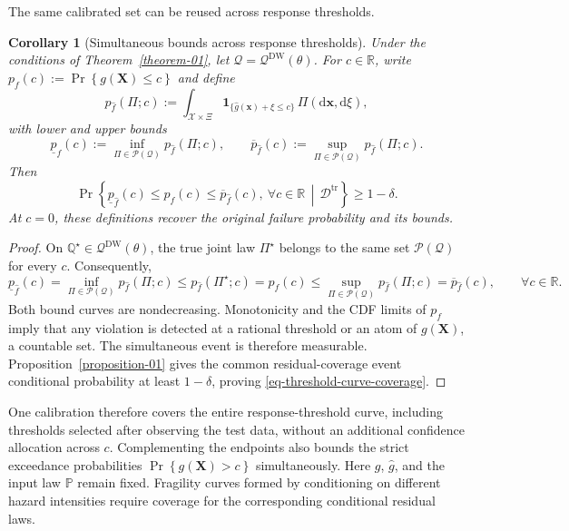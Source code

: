 \documentclass[review,11pt,3p,authoryear,nopreprintline]{elsarticle}
\newtheorem{corollary}{Corollary}
\begin{document}
The same calibrated set can be reused across response thresholds.

\begin{corollary}[Simultaneous bounds across response thresholds]
  \label{cor-simultaneous-threshold-bounds}
  Under the conditions of Theorem~\ref{theorem-01}, let $\mathcal Q=\mathcal Q^{\mathrm{DW}}(\theta)$. For $c\in\mathbb R$, write $p_f(c):=\Pr \left\{g(\bm X)\le c\right\}$ and define
  \[
    p_{\hat f}(\Pi;c):=\int_{\mathcal X\times\Xi}
      \mathbf1_{\{\hat g(\bm x)+\xi\le c\}}\,\Pi(\mathrm d\bm x,\mathrm d\xi),
  \]
  with lower and upper bounds
  \[
    \underline p_{\hat f}(c):=\inf_{\Pi\in\mathcal P(\mathcal Q)}p_{\hat f}(\Pi;c),
    \qquad
    \overline p_{\hat f}(c):=\sup_{\Pi\in\mathcal P(\mathcal Q)}p_{\hat f}(\Pi;c).
  \]
  Then
  \begin{equation}
    \Pr\left\{\underline p_{\hat f}(c)\le p_f(c)\le\overline p_{\hat f}(c),
      \ \forall c\in\mathbb R\,\middle|\,\mathcal D^{\mathrm{tr}}\right\}\ge1-\delta.
    \label{eq-threshold-curve-coverage}
  \end{equation}
  At $c=0$, these definitions recover the original failure probability and its bounds.
\end{corollary}
\begin{proof}
  On $\mathbb Q^\star\in\mathcal Q^{\mathrm{DW}}(\theta)$, the true joint law $\Pi^\star$ belongs to the same set $\mathcal P(\mathcal Q)$ for every $c$. Consequently,
  \[ 
    \underline p_{\hat f}(c) =\inf_{\Pi\in\mathcal P(\mathcal Q)} p_{\hat f}(\Pi;c) \le p_{\hat f}(\Pi^\star;c) =p_f(c) \le\sup_{\Pi\in\mathcal P(\mathcal Q)} p_{\hat f}(\Pi;c) =\overline p_{\hat f}(c), \qquad\forall c\in\mathbb R.
  \]
  Both bound curves are nondecreasing. Monotonicity and the CDF limits of $p_f$ imply that any violation is detected at a rational threshold or an atom of $g(\bm X)$, a countable set. The simultaneous event is therefore measurable. Proposition~\ref{proposition-01} gives the common residual-coverage event conditional probability at least $1-\delta$, proving \eqref{eq-threshold-curve-coverage}.
\end{proof}

One calibration therefore covers the entire response-threshold curve, including thresholds selected after observing the test data, without an additional confidence allocation across $c$. Complementing the endpoints also bounds the strict exceedance probabilities $\Pr \left\{g(\bm X)>c\right\}$ simultaneously. Here $g$, $\hat g$, and the input law $\mathbb P$ remain fixed. Fragility curves formed by conditioning on different hazard intensities require coverage for the corresponding conditional residual laws.
\end{document}
